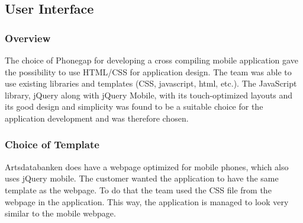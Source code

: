 \subsection{User Interface}
\subsubsection{Overview}
The choice of Phonegap for developing a cross compiling mobile application gave the possibility to use HTML/CSS for application design. The team was able to use existing libraries and templates (CSS, javascript, html, etc.).
The JavaScript library, jQuery along with jQuery Mobile, with its touch-optimized layouts and its good design and simplicity was found to be a suitable choice for the application development and was therefore chosen.

\subsubsection{Choice of Template}
Artsdatabanken does have a webpage optimized for mobile phones, which also uses jQuery mobile. The customer wanted the application to have the same template as the webpage. To do that the team used the CSS file from the webpage in the application. This way, the application is managed to look very similar to the mobile webpage.
